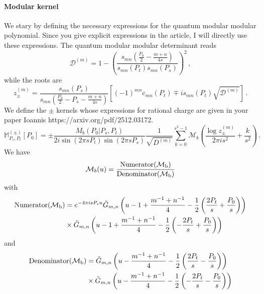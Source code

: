 \documentclass[11pt]{article}
\begin{document}
\paragraph{Modular kernel}
We stary by defining the necessary expressions for the quantum modular modular polynomial. Since you give explicit expressions in the article, I will directly use these expressions. The quantum modular modular determinant reads
\begin{equation}
    \mathcal{D}^{(m)}=1-\left(\frac{s_{mn}\left(\frac{P_0}{2}-\frac{m+n}{4s}\right)}{s_{mn}(P_t)s_{mn}(P_s)}\right)^2\,,
\end{equation}
while the roots are 
\begin{equation}
    z_{\pm}^{(m)}=\frac{s_{mn}(P_s)}{s_{mn}\left(\frac{P_0}{2}-P_s-\frac{m+n}{4s}\right)}\left[(-1)^{mn}c_{mn}(P_t)\mp i s_{mn}(P_t)\sqrt{\mathcal{D}^{(m)}}\right]\,.
\end{equation}
We define the $\pm$ kernels whose expressions for rational charge are given in your paper Ioannis https://arxiv.org/pdf/2512.03172.
\begin{equation}\label{eq:elementaryblocks}
    \mathbb{M}^{(\pm)}_{P_s, P_t} [P_0]
    =\pm \frac{M_b(P_0|P_s,P_t)}{2 i \sin(2\pi s P_t)\sin(2\pi s P_s)}\frac{1}{\sqrt{D^{(m)}}}\sum_{k=0}^{s^2-1} \mathcal{M}_b\left(\frac{\log z_{\pm}^{(m)}}{2\pi i s^2}+\frac{k}{s^2}\right)\,.
\end{equation}
We have
\begin{equation}
    \mathcal{M}_{b}(u)=\frac{\rm {Numerator} (\mathcal{M}_{b})}{\rm {Denominator} (\mathcal{M}_{b})}
\end{equation}
with
\begin{equation}
    \begin{aligned}
        \rm {Numerator} (\mathcal{M}_{b})&=e^{-4\pi i s P_s u}\tilde{G}_{m,n}\left(u-1+\frac{m^{-1}+n^{-1}}{4}-\frac{1}{2}\left(\frac{2P_t}{s}+\frac{P_0}{s}\right)\right)\\
        &\times\tilde{G}_{m,n}\left(u-1+\frac{m^{-1}+n^{-1}}{4}-\frac{1}{2}\left(-\frac{2P_t}{s}+\frac{P_0}{s}\right)\right)
    \end{aligned}
\end{equation}
and
\begin{equation}
    \begin{aligned}
        \rm {Denominator} (\mathcal{M}_{b})&=\tilde{G}_{m,n}\left(u-\frac{m^{-1}+n^{-1}}{4}-\frac{1}{2}\left(\frac{2P_t}{s}-\frac{P_0}{s}\right)\right)\\
        &\times\tilde{G}_{m,n}\left(u-\frac{m^{-1}+n^{-1}}{4}-\frac{1}{2}\left(-\frac{2P_t}{s}-\frac{P_0}{s}\right)\right)
    \end{aligned}
\end{equation}
\end{document}

